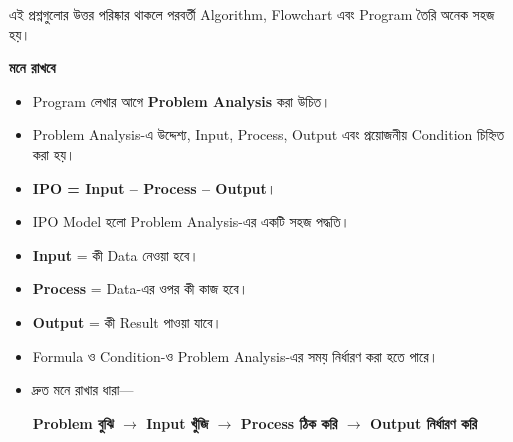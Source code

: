 এই প্রশ্নগুলোর উত্তর পরিষ্কার থাকলে পরবর্তী Algorithm,
Flowchart এবং Program তৈরি অনেক সহজ হয়।

\begin{rememberbox}

\textbf{\color{deepOrange}মনে রাখবে}

\begin{itemize}

\item Program লেখার আগে \textbf{Problem Analysis} করা উচিত।

\item Problem Analysis-এ উদ্দেশ্য, Input, Process, Output এবং
প্রয়োজনীয় Condition চিহ্নিত করা হয়।

\item \textbf{IPO = Input -- Process -- Output}।

\item IPO Model হলো Problem Analysis-এর একটি সহজ পদ্ধতি।

\item \textbf{Input} = কী Data নেওয়া হবে।

\item \textbf{Process} = Data-এর ওপর কী কাজ হবে।

\item \textbf{Output} = কী Result পাওয়া যাবে।

\item Formula ও Condition-ও Problem Analysis-এর সময়
নির্ধারণ করা হতে পারে।

\item দ্রুত মনে রাখার ধারা—

\begin{center}

\textbf{
Problem বুঝি
\(\longrightarrow\)
Input খুঁজি
\(\longrightarrow\)
Process ঠিক করি
\(\longrightarrow\)
Output নির্ধারণ করি
}

\end{center}

\end{itemize}

\end{rememberbox}

\small

